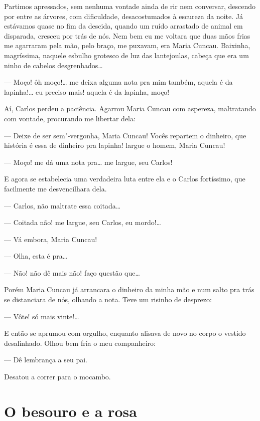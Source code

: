 \begin{linenumbers}
Partimos apressados, sem nenhuma vontade ainda de rir nem conversar,
descendo por entre as árvores, com dificuldade, desacostumados à
escureza da noite. Já estávamos quase no fim da descida, quando um ruído
arrastado de animal em disparada, cresceu por trás de nós. Nem bem eu me
voltara que duas mãos frias me agarraram pela mão, pelo braço, me
puxavam, era Maria Cuncau. Baixinha, magríssima, naquele esbulho
grotesco de luz das lantejoulas, cabeça que era um ninho de cabelos
desgrenhados\ldots{}

--- Moço! ôh moço!\ldots{} me deixa alguma nota pra mim também, aquela é da
lapinha!\ldots{} eu preciso mais! aquela é da lapinha, moço!

Aí, Carlos perdeu a paciência. Agarrou Maria Cuncau com aspereza,
maltratando com vontade, procurando me libertar dela:

--- Deixe de ser sem"-vergonha, Maria Cuncau! Vocês repartem o dinheiro,
que história é essa de dinheiro pra lapinha! largue o homem, Maria
Cuncau!

--- Moço! me dá uma nota pra\ldots{} me largue, seu Carlos!

E agora se estabelecia uma verdadeira luta entre ela e o Carlos
fortíssimo, que facilmente me desvencilhara dela.

--- Carlos, não maltrate essa coitada\ldots{}

--- Coitada não! me largue, seu Carlos, eu mordo!\ldots{}

--- Vá embora, Maria Cuncau!

--- Olha, esta é pra\ldots{}

--- Não! não dê mais não! faço questão que\ldots{}

Porém Maria Cuncau já arrancara o dinheiro da minha mão e num salto pra
trás se distanciara de nós, olhando a nota. Teve um risinho de desprezo:

--- Vôte! só mais vinte!\ldots{}

E então se aprumou com orgulho, enquanto alisava de novo no corpo o
vestido desalinhado. Olhou bem fria o meu companheiro:

--- Dê lembrança a seu pai.

Desatou a correr para o mocambo.
\end{linenumbers}

\chapter{O besouro e a rosa}


